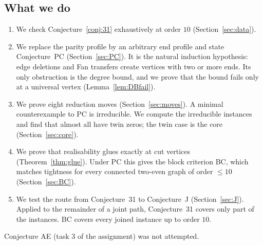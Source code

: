 \documentclass[11pt]{amsart}
\theoremstyle{definition}
\begin{document}
\subsection*{What we do}
\begin{enumerate}
\item We check Conjecture~\ref{conj:31} exhaustively at order $10$ (Section~\ref{sec:data}).
\item We replace the parity profile by an arbitrary end profile and state Conjecture~PC
(Section~\ref{sec:PC}). It is the natural induction hypothesis: edge deletions and
Fan transfers create vertices with two or more ends. Its only obstruction is the degree bound, and we
prove that the bound fails only at a universal vertex (Lemma~\ref{lem:DBfail}).
\item We prove eight reduction moves (Section~\ref{sec:moves}). A minimal counterexample to PC is
irreducible. We compute the irreducible instances and find that almost all have twin zeros; the twin
case is the core (Section~\ref{sec:core}).
\item We prove that realisability glues exactly at cut vertices (Theorem~\ref{thm:glue}). Under PC this
gives the block criterion BC, which matches tightness for every connected two-even graph of order
$\le 10$ (Section~\ref{sec:BC}).
\item We test the route from Conjecture~31 to Conjecture~J (Section~\ref{sec:J}). Applied to the remainder of
a joint path, Conjecture~31 covers only part of the instances. BC covers every joined instance up to
order $10$.
\end{enumerate}
Conjecture AE (task 3 of the assignment) was not attempted.
\end{document}
